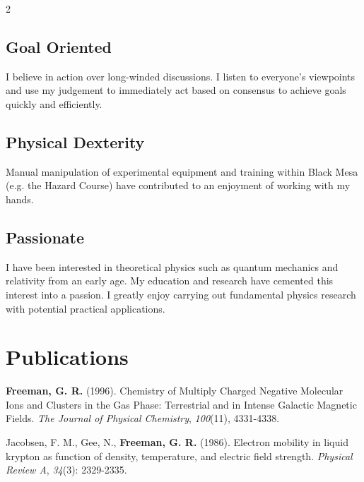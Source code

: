 \documentclass[
	10pt, %
]{FreemanCV}
\begin{document}
\begin{paracol}{2}
\subsection{Goal Oriented}

I believe in action over long-winded discussions. I listen to everyone's viewpoints and use my judgement to immediately act based on consensus to achieve goals quickly and efficiently.

\subsection{Physical Dexterity}

Manual manipulation of experimental equipment and training within Black Mesa (e.g. the Hazard Course) have contributed to an enjoyment of working with my hands.

\subsection{Passionate}

I have been interested in theoretical physics such as quantum mechanics and relativity from an early age. My education and research have cemented this interest into a passion. I greatly enjoy carrying out fundamental physics research with potential practical applications.


\section{Publications}


\textbf{Freeman, G. R.} (1996). Chemistry of Multiply Charged Negative Molecular Ions and Clusters in the Gas Phase: Terrestrial and in Intense Galactic Magnetic Fields. \textit{The Journal of Physical Chemistry}, \textit{100}(11), 4331-4338.

\medskip %

Jacobsen, F. M., Gee, N., \textbf{Freeman, G. R.} (1986). Electron mobility in liquid krypton as function of density, temperature, and electric field strength. \textit{Physical Review A}, \textit{34}(3): 2329-2335.

\medskip %


\end{paracol}
\end{document}
